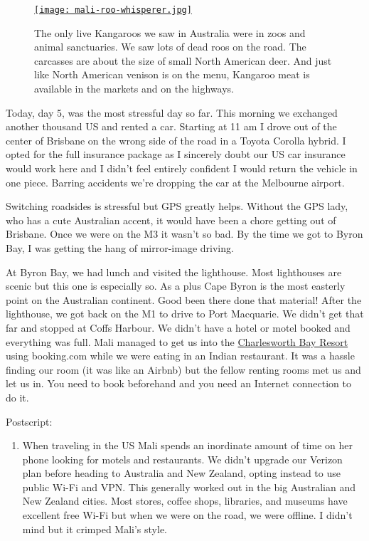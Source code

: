 \captionsetup[figure]{labelformat=empty}
\begin{SCfigure}[50]
\centering
\href{https://conceptcontrol.smugmug.com/Trips/Overseas/Australia-New-Zealand-2022/i-FdKCt59/A}{\texttt{[image: mali-roo-whisperer.jpg]}}
\caption[The only live Kangaroos we saw were in zoos]{The only live Kangaroos we saw in Australia were in zoos and
animal sanctuaries. We saw lots of dead roos on the road. The carcasses
are about the size of small North American deer. And just like North
American venison is on the menu, Kangaroo meat is available in the
markets and on the highways.}
\label{fig:7548x2}
\end{SCfigure}

Today, day 5, was the most stressful day so far. This morning we
exchanged another thousand US and rented a car. Starting at 11 am I
drove out of the center of Brisbane on the wrong side of the road in a
Toyota Corolla hybrid. I opted for the full insurance package as I
sincerely doubt our US car insurance would work here and I didn't feel
entirely confident I would return the vehicle in one piece. Barring
accidents we're dropping the car at the Melbourne airport.

Switching roadsides is stressful but GPS greatly helps. Without the GPS
lady, who has a cute Australian accent, it would have been a chore
getting out of Brisbane. Once we were on the M3 it wasn't so bad. By the
time we got to Byron Bay, I was getting the hang of mirror-image
driving.

At Byron Bay, we had lunch and visited the lighthouse. Most lighthouses
are scenic but this one is especially so. As a plus Cape Byron is the
most easterly point on the Australian continent. Good been there done
that material! After the lighthouse, we got back on the M1 to drive to
Port Macquarie. We didn't get that far and stopped at Coffs Harbour. We
didn't have a hotel or motel booked and everything was full. Mali
managed to get us into the
\href{https://charlesworthbaybeachresort.com.au/}{Charlesworth Bay
Resort} using booking.com while we were eating in an Indian restaurant.
It was a hassle finding our room (it was like an Airbnb) but the
fellow renting rooms met us and let us in. You need to book beforehand
and you need an Internet connection to do it.

Postscript:

\begin{enumerate}
\def\labelenumi{\arabic{enumi}.}
\item
  When traveling in the US Mali spends an inordinate amount of time on
  her phone looking for motels and restaurants. We didn't upgrade our
  Verizon plan before heading to Australia and New Zealand, opting
  instead to use public Wi-Fi and VPN. This generally worked out in the
  big Australian and New Zealand cities. Most stores, coffee shops,
  libraries, and museums have excellent free Wi-Fi but when we were on
  the road, we were offline. I didn't mind but it crimped Mali's style.
\end{enumerate}

